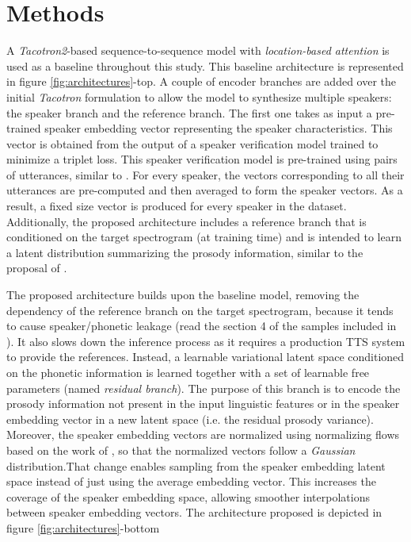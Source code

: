 \section{Methods}
A \textit{Tacotron2}-based sequence-to-sequence model with \textit{location-based attention} \autocite{Wang2017} is used as a baseline throughout this study. This baseline architecture is represented in figure \ref{fig:architectures}-top. A couple of encoder branches are added over the initial \textit{Tacotron} formulation to allow the model to synthesize multiple speakers: the speaker branch and the reference branch. The first one takes as input a pre-trained speaker embedding vector representing the speaker characteristics. This vector is obtained from the output of a speaker verification model trained to minimize a triplet loss. This speaker verification model is pre-trained using pairs of utterances, similar to  \autocite{Ren2019}. For every speaker, the vectors corresponding to all their utterances are pre-computed and then averaged to form the speaker vectors. As a result, a fixed size vector is produced for every speaker in the dataset. Additionally, the proposed architecture includes a reference branch that is conditioned on the target spectrogram (at training time) and is intended to learn a latent distribution summarizing the prosody information, similar to the proposal of \autocite{skerryryan2018}.




The proposed architecture builds upon the baseline model, removing the dependency of the reference branch on the target spectrogram, because it tends to cause speaker/phonetic leakage (read the section 4 of the samples included in \autocite{skerryryan2018}). It also slows down the inference process as it requires a production TTS system to provide the references. Instead, a learnable variational latent space conditioned on the phonetic information is learned together with a set of learnable free parameters (named \textit{residual branch}). The purpose of this branch is to encode the prosody information not present in the input linguistic features or in the speaker embedding vector in a new latent space (i.e. the residual prosody variance). Moreover, the speaker embedding vectors are normalized using normalizing flows based on the work of \autocite{kingma2018}, so that the normalized vectors follow a \textit{Gaussian} distribution.That change enables sampling from the speaker embedding latent space instead of just using the average embedding vector. This increases the coverage of the speaker embedding space, allowing smoother interpolations between speaker embedding vectors. The architecture proposed is depicted in figure \ref{fig:architectures}-bottom

